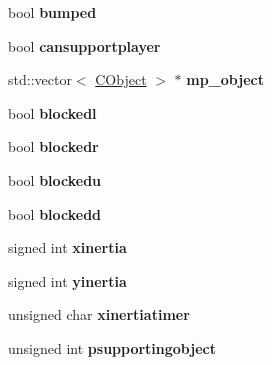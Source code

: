 \begin{DoxyCompactItemize}
\item 
\hypertarget{class_c_object_add99e4999dd8a5092b32b1d0cd8cb745}{
bool {\bfseries bumped}}
\label{class_c_object_add99e4999dd8a5092b32b1d0cd8cb745}

\item 
\hypertarget{class_c_object_a71516ce5c6874ae2a544ed5db0e8a4af}{
bool {\bfseries cansupportplayer}}
\label{class_c_object_a71516ce5c6874ae2a544ed5db0e8a4af}

\item 
\hypertarget{class_c_object_a9d7a8e98d2bd4e30739ca891f911df2d}{
std::vector$<$ \hyperlink{class_c_object}{CObject} $>$ $\ast$ {\bfseries mp\_\-object}}
\label{class_c_object_a9d7a8e98d2bd4e30739ca891f911df2d}

\item 
\hypertarget{class_c_object_a209a56c334686ea06483bc273265d6b0}{
bool {\bfseries blockedl}}
\label{class_c_object_a209a56c334686ea06483bc273265d6b0}

\item 
\hypertarget{class_c_object_a58ab54154ef2be948f46bd6805a89342}{
bool {\bfseries blockedr}}
\label{class_c_object_a58ab54154ef2be948f46bd6805a89342}

\item 
\hypertarget{class_c_object_a7e58dd5e2cf000b7a9b8243e7ef29198}{
bool {\bfseries blockedu}}
\label{class_c_object_a7e58dd5e2cf000b7a9b8243e7ef29198}

\item 
\hypertarget{class_c_object_aabe99422e580c20ea1d3efb462b1a081}{
bool {\bfseries blockedd}}
\label{class_c_object_aabe99422e580c20ea1d3efb462b1a081}

\item 
\hypertarget{class_c_object_a313b683341a0d1872e0f7cba17a0d94b}{
signed int {\bfseries xinertia}}
\label{class_c_object_a313b683341a0d1872e0f7cba17a0d94b}

\item 
\hypertarget{class_c_object_a6cdd9527d2199e2f77dfaea36984b5c6}{
signed int {\bfseries yinertia}}
\label{class_c_object_a6cdd9527d2199e2f77dfaea36984b5c6}

\item 
\hypertarget{class_c_object_afe19e18d99788809a9f7b6a5d084ba56}{
unsigned char {\bfseries xinertiatimer}}
\label{class_c_object_afe19e18d99788809a9f7b6a5d084ba56}

\item 
\hypertarget{class_c_object_ac468c47bd83a6b20c8c5419a8eff7266}{
unsigned int {\bfseries psupportingobject}}
\label{class_c_object_ac468c47bd83a6b20c8c5419a8eff7266}


\end{DoxyCompactItemize}
